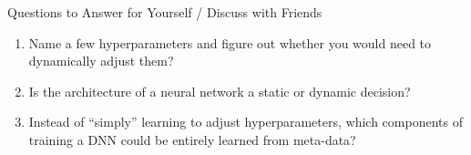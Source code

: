 \begin{frame}[c]{Questions to Answer for Yourself / Discuss with Friends}
    
    \begin{enumerate}
        \item Name a few hyperparameters and figure out whether you would need to dynamically adjust them?
        \item Is the architecture of a neural network a static or dynamic decision?
        \item Instead of ``simply'' learning to adjust hyperparameters, which components of training a DNN could be entirely learned from meta-data?
    \end{enumerate}
    
\end{frame}


